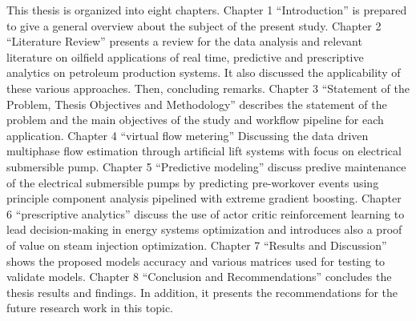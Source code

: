 This thesis is organized into eight chapters. Chapter 1 “Introduction” is prepared to give a general overview about the subject of the present study. Chapter 2 “Literature Review” presents a review for the data analysis and relevant literature on oilfield applications of real time, predictive and prescriptive analytics on petroleum production  systems. It also discussed the applicability of these various approaches. Then, concluding remarks. Chapter 3 “Statement of the Problem, Thesis Objectives and Methodology” describes the statement of the problem and the main objectives of the study and workflow pipeline for each application. Chapter 4 “virtual flow metering” Discussing the data driven multiphase flow estimation through artificial lift systems with focus on electrical submersible pump. Chapter 5 “Predictive modeling” discuss predive maintenance of the electrical submersible pumps by predicting pre-workover events using principle component analysis pipelined with extreme gradient boosting. Chapter 6 “prescriptive analytics” discuss the use of actor critic reinforcement learning to lead decision-making in energy systems optimization and introduces also a proof of value on steam injection optimization. Chapter 7 “Results and Discussion” shows the proposed models accuracy and various matrices used for testing to validate models. Chapter 8 “Conclusion and Recommendations” concludes the thesis results and findings. In addition, it presents the recommendations for the future research work in this topic.
